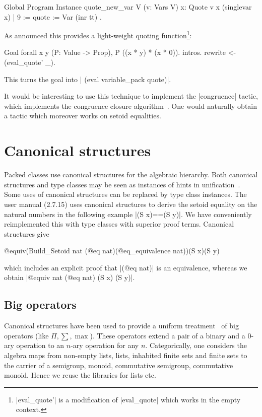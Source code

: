 \documentclass[a4paper,10pt, runningheads]{llncs}
\begin{document}
\begin{code}
Global Program Instance quote_new_var V (v: Vars V) x:
  Quote v x (singlevar x) | 9 := { quote := Var (inr tt) }.
\end{code}

\noindent As announced this provides a light-weight quoting function\footnote{|eval_quote'| is a
modification of |eval_quote| which works in the empty context.}:
\begin{code}
Goal forall x y (P: Value -> Prop), P ((x * y) * (x * 0)).
  intros. rewrite <- (eval_quote' _).
\end{code}
This turns the goal into | (eval variable_pack quote)|.

It would be interesting to use this technique to implement the |congruence| tactic, which implements
the congruence closure algorithm~\cite{corbineau2007deciding}. One would naturally obtain a tactic
which moreover works on setoid equalities.

\section{Canonical structures}\label{canonical}
Packed classes use canonical structures for the algebraic hierarchy. Both canonical structures and
type classes may be seen as instances of hints in unification~\cite{Hints}. Some uses of canonical
structures can be replaced by type class instances. The user manual (2.7.15) uses canonical
structures to derive the setoid equality on the natural
numbers in the following example |(S x)==(S y)|. We have conveniently reimplemented this with
type classes with superior proof terms. Canonical structures give
\begin{code}
@equiv(Build_Setoid nat (@eq nat)(@eq_equivalence nat))(S x)(S y)
\end{code}

which includes an explicit proof that |(@eq nat)| is an equivalence,
whereas we obtain |@equiv nat (@eq nat) (S x) (S y)|.

\subsection{Big operators}
Canonical structures have been used to provide a uniform treatment~\cite{bertot2008canonical} of big
operators (like $\Pi,\sum, \max$). These operators extend a pair of a binary and a 0-ary operation
to an $n$-ary operation for any $n$. Categorically, one considers the algebra maps from non-empty
lists, lists, inhabited finite sets and finite sets to the carrier of a semigroup, monoid,
commutative semigroup, commutative monoid. Hence we reuse the libraries for lists etc.
\end{document}
